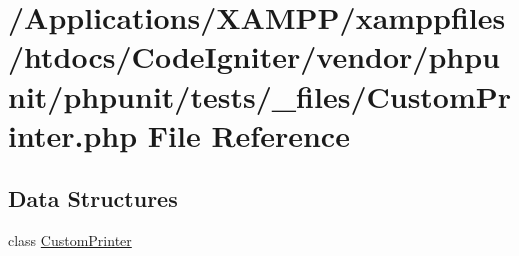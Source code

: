 \hypertarget{_custom_printer_8php}{}\section{/\+Applications/\+X\+A\+M\+P\+P/xamppfiles/htdocs/\+Code\+Igniter/vendor/phpunit/phpunit/tests/\+\_\+files/\+Custom\+Printer.php File Reference}
\label{_custom_printer_8php}
\subsection*{Data Structures}
\begin{DoxyCompactItemize}
\item 
class \mbox{\hyperlink{class_custom_printer}{Custom\+Printer}}
\end{DoxyCompactItemize}
